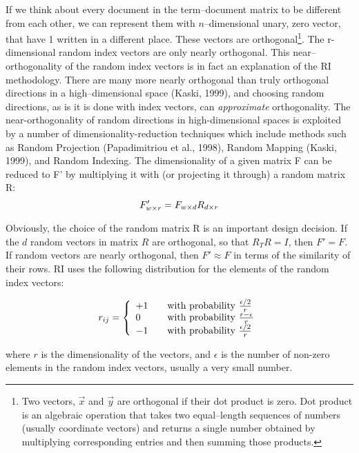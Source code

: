 If we think about every document in the term--document matrix to be different from each other,
we can represent them with $n$--dimensional unary, zero vector, that have 1 written in a different place. 
These vectors are orthogonal\footnote{Two vectors, $\vec x$ and $\vec y$ are orthogonal if their dot product is zero. Dot product is an algebraic operation that takes two equal--length sequences of numbers (usually coordinate vectors) and returns a single number obtained by multiplying corresponding entries and then summing those products.}. 
The r-dimensional random index vectors are only nearly orthogonal. This near--orthogonality of the
 random index vectors is in fact an explanation of the RI methodology. There are many more
 nearly orthogonal than truly orthogonal directions in a high--dimensional space (Kaski, 1999), and 
choosing  random directions, as is it is done with index vectors, can \textit{approximate} orthogonality.
The near-orthogonality of random directions in high-dimensional spaces is exploited
by a number of dimensionality-reduction techniques which include methods
such as Random Projection (Papadimitriou et al., 1998), Random Mapping (Kaski, 1999),
 and Random Indexing.
The dimensionality of a given matrix F can be reduced to F' by multiplying it with (or projecting it through) a random matrix R:
\begin{equation}
\large{
F'_{w \times r} = F_{w \times d}R_{d \times r}
}
\end{equation}

Obviously, the choice of the random matrix R is an important design decision. If the $d$ random vectors 
in matrix $R$ are orthogonal, so that $R_{T}R= I$, then $F' = F$. If random vectors are nearly 
orthogonal, then $F'\approx F$ in terms of the similarity of their rows. RI uses the following distribution
for the elements of the random index vectors:
\begin{center}
\begin{equation}
 r_{ij} = \left\{ 
\begin{array}{l l} 
    +1 & \quad \textrm{with probability $\frac{\epsilon/2}{r}$}\\
      0  & \quad \textrm{with probability $\frac{r-\epsilon}{r}$}\\
    -1 & \quad \textrm{with probability $\frac{\epsilon/2}{r}$}\\
  \end{array} \right.
\end{equation}
\end{center}
where $r$ is the dimensionality of the vectors, and $\epsilon$ is the number of non-zero
elements in the random index vectors, usually a very small number.

